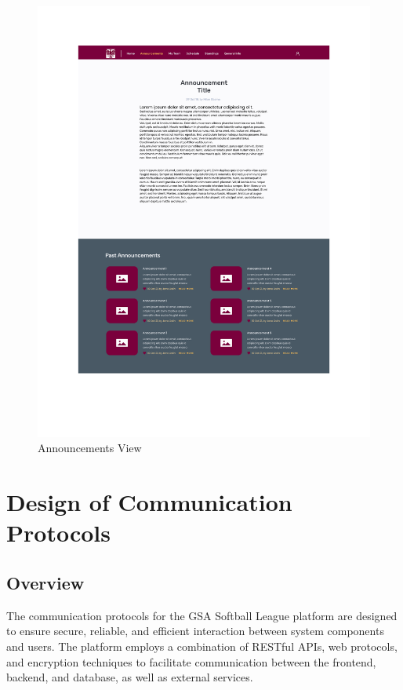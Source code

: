 \documentclass[12pt, titlepage]{article}
\begin{document}
\begin{figure}[H]
  \centering
  \includegraphics[scale=0.6]{AnnouncementsView.pdf}
  \caption{Announcements View}
  \label{fig:announcements_view}
\end{figure}


\section{Design of Communication Protocols}

\subsection*{Overview}
The communication protocols for the GSA Softball League platform are designed to ensure secure, reliable, and efficient interaction between system components and users. The platform employs a combination of RESTful APIs, web protocols, and encryption techniques to facilitate communication between the frontend, backend, and database, as well as external services.
\end{document}

